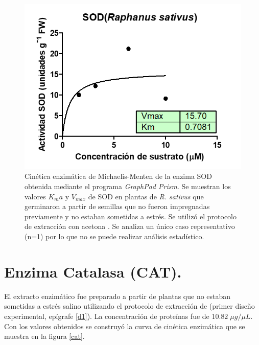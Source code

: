 \begin{figure}[hbtp]
	\centering
	\includegraphics[scale=0.99]{Imagenes/SODacet}
	\caption{Cin\'etica enzim\'atica de Michaelis-Menten de la enzima SOD obtenida mediante el programa \textit{GraphPad Prism}. Se muestran los valores $K_ma$ y $V_{max}$ de SOD en plantas de \textit{R. sativus} que germinaron a partir de semillas que no fueron impregnadas previamente y no estaban sometidas a estr\'es. Se utiliz\'o el protocolo de extracci\'on con acetona \citep{baquero2005catalase}. Se analiza un único caso representativo (n=1) por lo que no se puede realizar análisis estadístico.}
	\label{SODacet}
\end{figure}

\pagebreak

\section{Enzima Catalasa (CAT).}

El extracto enzim\'atico fue preparado a partir de plantas que no estaban sometidas a estr\'es salino utilizando el protocolo de extracci\'on de \cite{liu2010exogenous} (primer dise\~no experimental, ep\'igrafe \ref{d1}). La concentraci\'on de prote\'inas fue de $10.82 \; \mu g/ \mu L$. Con los valores obtenidos se construy\'o la curva de cin\'etica enzim\'atica que se muestra en la figura \ref{cat}.\\

